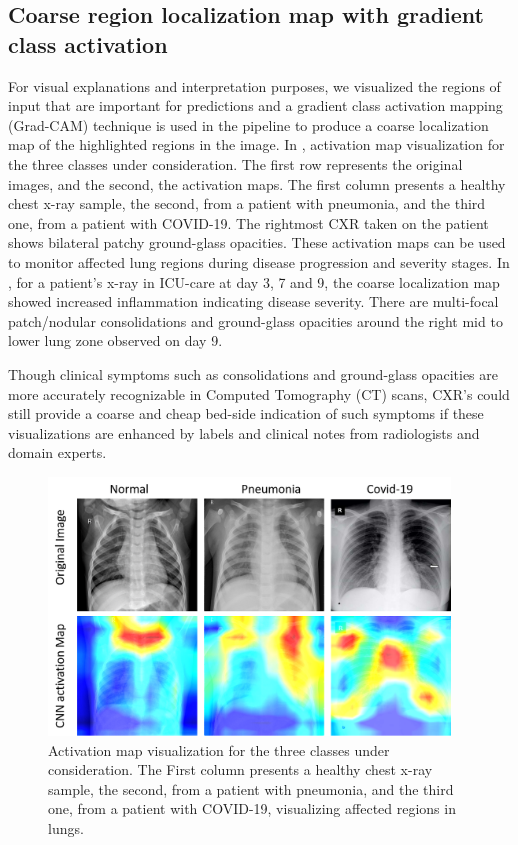 \subsection{Coarse region localization map with gradient class activation}
 For visual explanations and interpretation purposes, we visualized the regions of input that are important for predictions and a gradient class activation mapping (Grad-CAM) technique \cite{selvaraju2017grad} is used in the pipeline to produce a coarse localization map of the highlighted regions in the image. In , activation map visualization for the three classes under consideration.  The first row represents the original images, and the second, the activation maps. The first column presents a healthy chest x-ray sample, the second, from a patient with pneumonia, and the third one, from a patient with COVID-19. The rightmost CXR taken on the patient shows bilateral patchy ground-glass opacities. These activation maps can be used to monitor affected lung regions during disease progression and severity stages.  In , for a patient's x-ray in ICU-care at day 3, 7 and 9, the coarse localization map showed increased inflammation indicating disease severity. There are multi-focal patch/nodular consolidations and ground-glass opacities around the right mid to lower lung zone observed on day 9.
 
 Though clinical symptoms such as consolidations and ground-glass opacities \cite{li2020ct} are more accurately recognizable in Computed Tomography (CT) scans, CXR's could still provide a coarse and cheap bed-side indication of such symptoms if these visualizations are enhanced by labels and clinical notes from radiologists and domain experts.

\begin{figure}[h!]
\centering
\includegraphics[width=0.95\textwidth]{images/Picture2_3 class.png}
   \caption{Activation map visualization for the three classes under consideration. The First column presents a healthy chest x-ray sample, the second, from a patient with
pneumonia, and the third one, from a patient with COVID-19, visualizing affected regions in lungs.}
\label{fig:activation_map_2}
\end{figure}

